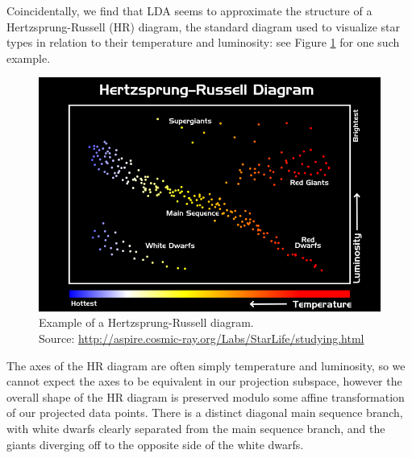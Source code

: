 \documentclass[letterpaper, 10 pt, conference]{ieeeconf}  %
\begin{document}
Coincidentally, we find that LDA seems to approximate the structure of a Hertzsprung-Russell (HR) diagram, the standard diagram used to visualize star types in relation to their temperature and luminosity: see Figure \ref{fig:HRdiagram} for one such example.
\begin{figure}
    \centering
    \includegraphics[width=\columnwidth]{figs/hrdiagram.png}
    \caption{Example of a Hertzsprung-Russell diagram.\\ Source: \url{http://aspire.cosmic-ray.org/Labs/StarLife/studying.html}}
    \label{fig:HRdiagram}
\end{figure}
The axes of the HR diagram are often simply temperature and luminosity, so we cannot expect the axes to be equivalent in our projection subspace, however the overall shape of the HR diagram is preserved modulo some affine transformation of our projected data points. 
There is a distinct diagonal main sequence branch, with white dwarfs clearly separated from the main sequence branch, and the giants diverging off to the opposite side of the white dwarfs.

\end{document}
